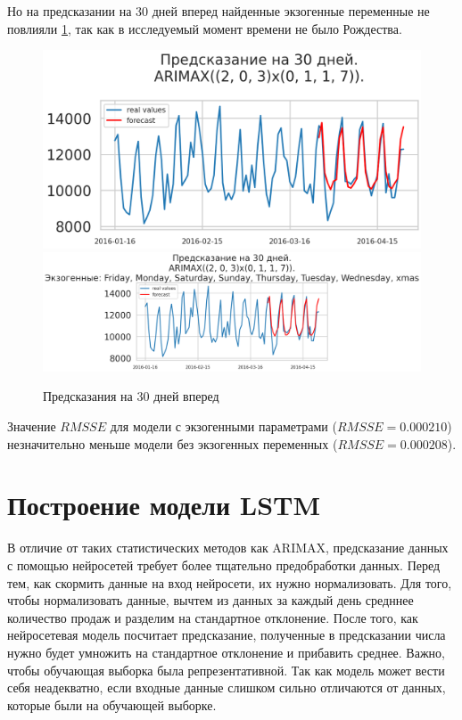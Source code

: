 Но на предсказании на 30 дней вперед найденные экзогенные переменные не повлияли \ref{img:arimax_forecast},
так как в исследуемый момент времени не было Рождества.

\def\figurename{Рис}
\begin{figure}[t]
	\centering
	\includegraphics[width=0.9\columnwidth]{./img/arimax_simple_pred30.png}
	\includegraphics[width=0.9\columnwidth]{./img/arimax_with_exog_pred30.png}
	\caption{Предсказания на 30 дней вперед}
	\label{img:arimax_forecast}
\end{figure}

Значение $ RMSSE $ для модели с экзогенными параметрами ($ RMSSE = 0.000210 $) незначительно меньше
модели без экзогенных переменных ($ RMSSE = 0.000208 $).


\section{Построение модели LSTM}

В отличие от таких статистических методов как ARIMAX, предсказание данных
с помощью нейросетей требует более тщательно предобработки данных.
Перед тем, как скормить данные на вход нейросети, их нужно нормализовать.
Для того, чтобы нормализовать данные, вычтем из данных за каждый день средннее
количество продаж и разделим на стандартное отклонение. После того, как
нейросетевая модель посчитает предсказание, полученные в предсказании
числа нужно будет умножить на стандартное отклонение и прибавить среднее.
Важно, чтобы обучающая выборка была репрезентативной. Так как модель
может вести себя неадекватно, если входные данные слишком сильно отличаются
от данных, которые были на обучающей выборке.

